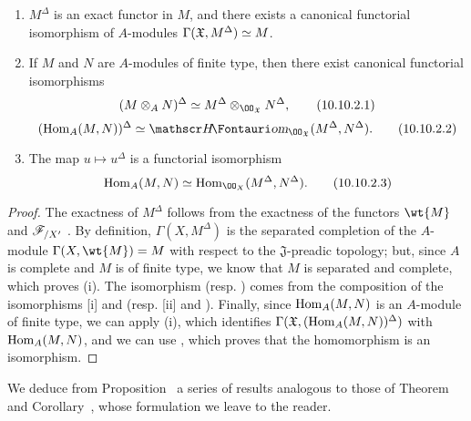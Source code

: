 \begin{prop}[10.10.2]
\label{1.10.10.2}
\medskip\noindent
\begin{enumerate}[label=\emph{(\roman*)}]
  \item $M^\Delta$ is an exact functor in $M$, and there exists a canonical functorial isomorphism of $A$-modules $\Gamma(\mathfrak{X},M^\Delta)\simeq M$.
  \item If $M$ and $N$ are $A$-modules of finite type, then there exist canonical functorial isomorphisms
    \begin{equation*}
    \label{1.10.10.2.1}
      (M\otimes_A N)^\Delta\isoto M^\Delta\otimes_{\OO_\mathfrak{X}}N^\Delta,
      \tag{10.10.2.1}
    \end{equation*}
    \begin{equation*}
    \label{1.10.10.2.2}
      (\Hom_A(M,N))^\Delta\isoto\shHom_{\OO_\mathfrak{X}}(M^\Delta,N^\Delta).
      \tag{10.10.2.2}
    \end{equation*}
  \item The map $u\mapsto u^\Delta$ is a functorial isomorphism
    \begin{equation*}
    \label{1.10.10.2.3}
      \Hom_A(M,N)\isoto\Hom_{\OO_X}(M^\Delta,N^\Delta).
      \tag{10.10.2.3}
    \end{equation*}
\end{enumerate}
\end{prop}

\begin{proof}
\label{proof-1.10.10.2}
The exactness of $M^\Delta$ follows from the exactness of the functors $\wt{M}$  and $\mathscr{F}_{/X'}$ .
By definition, $\Gamma(X,M^\Delta)$ is the separated completion of the $A$-module $\Gamma(X,\wt{M})=M$ with respect to the $\mathfrak{J}$-preadic topology; but, since $A$ is complete and $M$ is of finite type, we know  that $M$ is separated and complete, which proves (i).
The isomorphism  (resp. ) comes from the composition of the isomorphisms [i] and  (resp. [ii] and ).
Finally, since $\operatorname{Hom}_A(M,N)$ is an $A$-module of finite type, we can apply (i), which identifies $\Gamma(\mathfrak{X},(\operatorname{Hom}_A(M,N))^\Delta)$ with $\operatorname{Hom}_A(M,N)$, and we can use , which proves that the homomorphism  is an isomorphism.
\end{proof}

We deduce from Proposition~ a series of results analogous to those of Theorem~ and Corollary~, whose formulation we leave to the reader.

